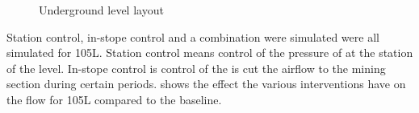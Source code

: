 	\begin{figure}[h!]
		\centering
		\caption{Underground level layout}
		\label{fig: KUS Simulation level layout}
	\end{figure}	
	\clearpage
	Station control, in-stope control and a combination were simulated were all simulated for 105L. Station control means control of the pressure of at the station of the level. In-stope control is control of the is cut the airflow to the mining section during certain periods.  shows the effect the various interventions have on the flow for 105L compared to the baseline.

